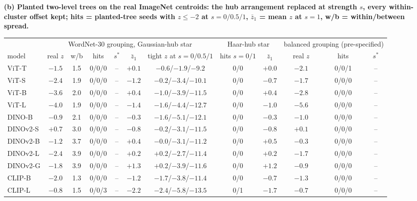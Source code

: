 \begin{table}[H]
\begin{tabular}{llcccccc}
\bottomrule
\end{tabular}
\par\vspace{5pt}
\endgroup
\begingroup
\noindent\textbf{(b) Planted two-level trees on the real ImageNet centroids: the hub arrangement replaced at strength $s$, every within-cluster offset kept; hits = planted-tree seeds with $z\le-2$ at $s{=}0/0.5/1$, $\bar z_1$ = mean $z$ at $s{=}1$, w/b = within/between spread.}\par\vspace{1.5pt}
\setlength{\tabcolsep}{1.8pt}
\begin{tabular}{lcccccc|cc|ccc}
\toprule
 & \multicolumn{6}{c|}{WordNet-30 grouping, Gaussian-hub star} & \multicolumn{2}{c|}{Haar-hub star} & \multicolumn{3}{c}{balanced grouping (pre-specified)} \\
model & real $z$ & w/b & hits & $s^*$ & $\bar z_1$ & tight $z$ at $s{=}0/0.5/1$ & hits $s{=}0/1$ & $\bar z_1$ & real $z$ & hits & $s^*$ \\
\midrule
ViT-T & $-1.5$ & 1.5 & 0/0/0 & -- & $+0.1$ & $-0.6$/$-1.9$/$-9.2$ & 0/0 & $+0.0$ & $-2.1$ & 0/0/1 & -- \\
ViT-S & $-2.4$ & 1.9 & 0/0/0 & -- & $-1.2$ & $-0.2$/$-3.4$/$-10.1$ & 0/0 & $-0.7$ & $-1.7$ & 0/0/0 & -- \\
ViT-B & $-3.6$ & 2.0 & 0/0/0 & -- & $+0.4$ & $-1.0$/$-3.9$/$-11.5$ & 0/0 & $+0.4$ & $-2.8$ & 0/0/0 & -- \\
ViT-L & $-4.0$ & 1.9 & 0/0/0 & -- & $-1.4$ & $-1.6$/$-4.4$/$-12.7$ & 0/0 & $-1.0$ & $-5.6$ & 0/0/0 & -- \\
\midrule
DINO-B & $-0.9$ & 2.1 & 0/0/0 & -- & $-0.3$ & $-1.6$/$-5.1$/$-12.1$ & 0/0 & $-0.3$ & $-1.0$ & 0/0/0 & -- \\
DINOv2-S & $+0.7$ & 3.0 & 0/0/0 & -- & $-0.8$ & $-0.2$/$-3.1$/$-11.5$ & 0/0 & $-0.8$ & $+0.1$ & 0/0/0 & -- \\
DINOv2-B & $-1.2$ & 3.7 & 0/0/0 & -- & $+0.4$ & $-0.0$/$-3.1$/$-11.2$ & 0/0 & $+0.5$ & $-0.3$ & 0/0/0 & -- \\
DINOv2-L & $-2.4$ & 3.9 & 0/0/0 & -- & $+0.2$ & $+0.2$/$-2.7$/$-11.4$ & 0/0 & $+0.2$ & $-1.7$ & 0/0/0 & -- \\
DINOv2-G & $-1.8$ & 3.9 & 0/0/0 & -- & $+1.3$ & $+0.2$/$-3.9$/$-11.6$ & 0/0 & $+1.2$ & $-0.9$ & 0/0/0 & -- \\
\midrule
CLIP-B & $-2.0$ & 1.3 & 0/0/0 & -- & $-1.2$ & $-1.7$/$-3.8$/$-11.4$ & 0/0 & $-0.7$ & $-1.3$ & 0/0/0 & -- \\
CLIP-L & $-0.8$ & 1.5 & 0/0/3 & -- & $-2.2$ & $-2.4$/$-5.8$/$-13.5$ & 0/1 & $-1.7$ & $-0.7$ & 0/0/0 & -- \\

\end{tabular}
\end{table}
